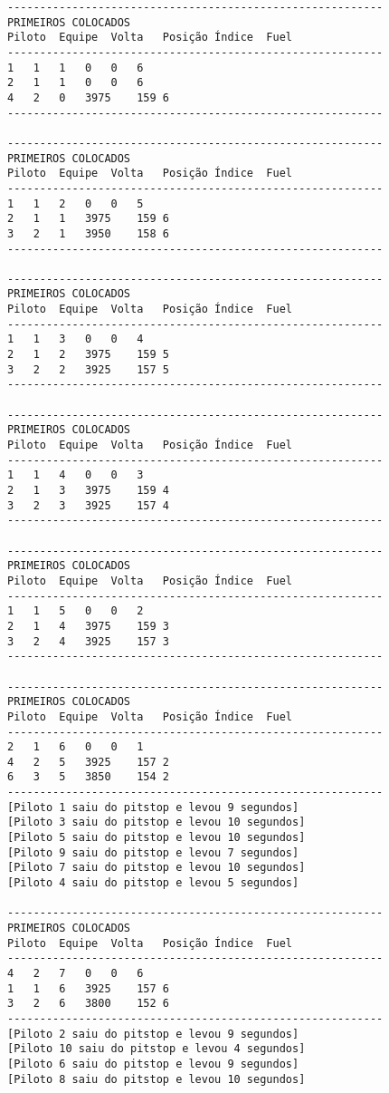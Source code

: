 \documentclass[12pt]{article}
\begin{document}
\begin{verbatim}
----------------------------------------------------------
PRIMEIROS COLOCADOS
Piloto	Equipe	Volta	Posição	Índice	Fuel
----------------------------------------------------------
1	1	1	0	0	6
2	1	1	0	0	6
4	2	0	3975	159	6
----------------------------------------------------------

----------------------------------------------------------
PRIMEIROS COLOCADOS
Piloto	Equipe	Volta	Posição	Índice	Fuel
----------------------------------------------------------
1	1	2	0	0	5
2	1	1	3975	159	6
3	2	1	3950	158	6
----------------------------------------------------------

----------------------------------------------------------
PRIMEIROS COLOCADOS
Piloto	Equipe	Volta	Posição	Índice	Fuel
----------------------------------------------------------
1	1	3	0	0	4
2	1	2	3975	159	5
3	2	2	3925	157	5
----------------------------------------------------------

----------------------------------------------------------
PRIMEIROS COLOCADOS
Piloto	Equipe	Volta	Posição	Índice	Fuel
----------------------------------------------------------
1	1	4	0	0	3
2	1	3	3975	159	4
3	2	3	3925	157	4
----------------------------------------------------------

----------------------------------------------------------
PRIMEIROS COLOCADOS
Piloto	Equipe	Volta	Posição	Índice	Fuel
----------------------------------------------------------
1	1	5	0	0	2
2	1	4	3975	159	3
3	2	4	3925	157	3
----------------------------------------------------------

----------------------------------------------------------
PRIMEIROS COLOCADOS
Piloto	Equipe	Volta	Posição	Índice	Fuel
----------------------------------------------------------
2	1	6	0	0	1
4	2	5	3925	157	2
6	3	5	3850	154	2
----------------------------------------------------------
[Piloto 1 saiu do pitstop e levou 9 segundos]
[Piloto 3 saiu do pitstop e levou 10 segundos]
[Piloto 5 saiu do pitstop e levou 10 segundos]
[Piloto 9 saiu do pitstop e levou 7 segundos]
[Piloto 7 saiu do pitstop e levou 10 segundos]
[Piloto 4 saiu do pitstop e levou 5 segundos]

----------------------------------------------------------
PRIMEIROS COLOCADOS
Piloto	Equipe	Volta	Posição	Índice	Fuel
----------------------------------------------------------
4	2	7	0	0	6
1	1	6	3925	157	6
3	2	6	3800	152	6
----------------------------------------------------------
[Piloto 2 saiu do pitstop e levou 9 segundos]
[Piloto 10 saiu do pitstop e levou 4 segundos]
[Piloto 6 saiu do pitstop e levou 9 segundos]
[Piloto 8 saiu do pitstop e levou 10 segundos]


\end{verbatim}
\end{document}
